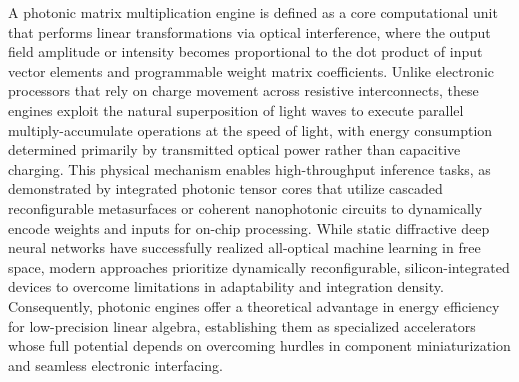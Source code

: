 A photonic matrix multiplication engine is defined as a core computational unit that performs linear transformations via optical interference, where the output field amplitude or intensity becomes proportional to the dot product of input vector elements and programmable weight matrix coefficients. \citep{doi_10_1109_hpca57654_2024_00059_f488ee7a} Unlike electronic processors that rely on charge movement across resistive interconnects, these engines exploit the natural superposition of light waves to execute parallel multiply-accumulate operations at the speed of light, with energy consumption determined primarily by transmitted optical power rather than capacitive charging. \citep{doi_10_1109_icop56156_2022_9911729_8d67554d} \citep{doi_10_1145_3716368_3735243_93c8da73} This physical mechanism enables high-throughput inference tasks, as demonstrated by integrated photonic tensor cores that utilize cascaded reconfigurable metasurfaces or coherent nanophotonic circuits to dynamically encode weights and inputs for on-chip processing. While static diffractive deep neural networks have successfully realized all-optical machine learning in free space, modern approaches prioritize dynamically reconfigurable, silicon-integrated devices to overcome limitations in adaptability and integration density. Consequently, photonic engines offer a theoretical advantage in energy efficiency for low-precision linear algebra, establishing them as specialized accelerators whose full potential depends on overcoming hurdles in component miniaturization and seamless electronic interfacing. \citep{doi_10_1088_1402_4896_ae8345_3b948559} \citep{doi_10_1515_nanoph_2022_0423_38a2c3ec} \citep{doi_10_3390_nano14080697_c372a140}


